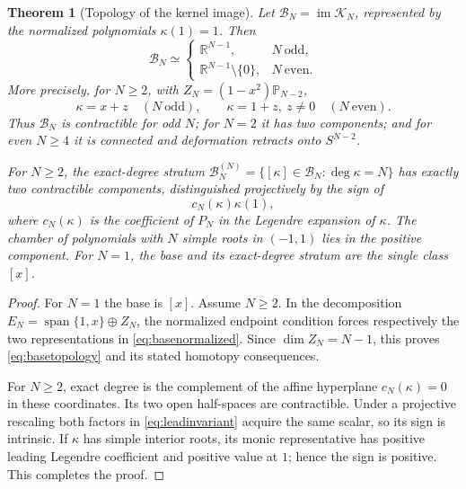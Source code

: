 \documentclass[11pt,a4paper]{article}
\newtheorem{theorem}{Theorem}[section]
\theoremstyle{definition}
\theoremstyle{remark}
\newcommand{\R}{\mathbb{R}}
\newcommand{\Pp}{\mathbb{P}}
\newcommand{\im}{\operatorname{im}}
\newcommand{\spanof}{\operatorname{span}}
\newcommand{\cB}{\mathcal{B}}
\newcommand{\cK}{\mathcal{K}}
\begin{document}
\begin{theorem}[Topology of the kernel image]\label{thm:basetopology}
Let $\cB_N=\im\cK_N$, represented by the normalized polynomials $\kappa(1)=1$.  Then
\begin{equation}\label{eq:basetopology}
 \boxed{
 \cB_N\simeq
 \begin{cases}
  \R^{N-1},&N\ \text{odd},\\
  \R^{N-1}\setminus\{0\},&N\ \text{even}.
 \end{cases}}
\end{equation}
More precisely, for $N\geq2$, with $Z_N=(1-x^2)\Pp_{N-2}$,
\begin{equation}\label{eq:basenormalized}
 \kappa=x+z\quad(N\ \text{odd}),
 \qquad
 \kappa=1+z,\ z\neq0\quad(N\ \text{even}).
\end{equation}
Thus $\cB_N$ is contractible for odd $N$; for $N=2$ it has two components; and for even
$N\geq4$ it is connected and deformation retracts onto $S^{N-2}$.

For $N\geq2$, the exact-degree stratum
$\cB_N^{(N)}=\{[\kappa]\in\cB_N:\deg\kappa=N\}$ has exactly two contractible components,
distinguished projectively by the sign of
\begin{equation}\label{eq:leadinvariant}
 c_N(\kappa)\kappa(1),
\end{equation}
where $c_N(\kappa)$ is the coefficient of $P_N$ in the Legendre expansion of $\kappa$.
The chamber of polynomials with $N$ simple roots in $(-1,1)$ lies in the positive component.
For $N=1$, the base and its exact-degree stratum are the single class $[x]$.
\end{theorem}

\begin{proof}
For $N=1$ the base is $[x]$.  Assume $N\geq2$.  In the decomposition
$E_N=\spanof\{1,x\}\oplus Z_N$, the normalized endpoint condition
forces respectively the two representations in \eqref{eq:basenormalized}.  Since
$\dim Z_N=N-1$, this proves \eqref{eq:basetopology} and its stated homotopy consequences.

For $N\geq2$, exact degree is the complement of the affine hyperplane
$c_N(\kappa)=0$ in these coordinates.  Its two open half-spaces are contractible.  Under a
projective rescaling both factors in \eqref{eq:leadinvariant} acquire the same scalar, so
its sign is intrinsic.  If $\kappa$ has simple interior roots, its monic representative has
positive leading Legendre coefficient and positive value at $1$; hence the sign is positive.
This completes the proof.
\end{proof}
\end{document}

